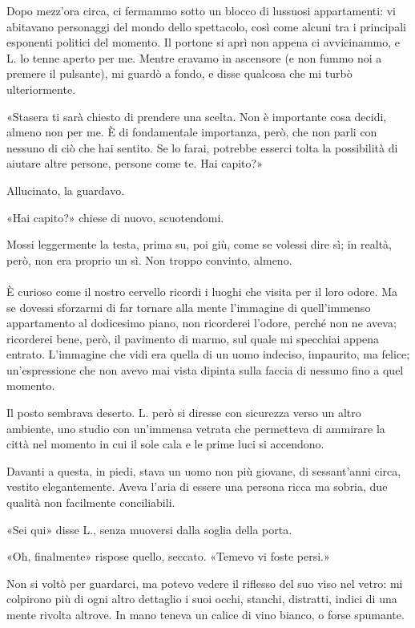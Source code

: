 \documentclass[a4paper,12pt]{book}
\begin{document}
Dopo mezz’ora circa, ci fermammo sotto un blocco di lussuosi appartamenti: vi
abitavano personaggi del mondo dello spettacolo, così come alcuni tra i
principali esponenti politici del momento. Il portone si aprì non appena ci
avvicinammo, e L. lo tenne aperto per me. Mentre eravamo in ascensore (e non
fummo noi a premere il pulsante), mi guardò a fondo, e disse qualcosa che mi
turbò ulteriormente.

«Stasera ti sarà chiesto di prendere una scelta. Non è importante cosa
decidi, almeno non per me. È di fondamentale importanza, però, che non parli
con nessuno di ciò che hai sentito. Se lo farai, potrebbe esserci tolta la
possibilità di aiutare altre persone, persone come te. Hai capito?»

Allucinato, la guardavo.

«Hai capito?» chiese di nuovo, scuotendomi.

Mossi leggermente la testa, prima su, poi giù, come se volessi dire sì; in
realtà, però, non era proprio un sì. Non troppo convinto, almeno.

\paragraph{}
È curioso come il nostro cervello ricordi i luoghi che visita per il loro
odore. Ma se dovessi sforzarmi di far tornare alla mente l’immagine di
quell’immenso appartamento al dodicesimo piano, non ricorderei l’odore,
perché non ne aveva; ricorderei bene, però, il pavimento di marmo, sul quale
mi specchiai appena entrato. L’immagine che vidi era quella di un uomo
indeciso, impaurito, ma felice; un’espressione che non avevo mai vista dipinta
sulla faccia di nessuno fino a quel momento.

Il posto sembrava deserto. L. però si diresse con sicurezza verso un altro
ambiente, uno studio con un’immensa vetrata che permetteva di ammirare la
città nel momento in cui il sole cala e le prime luci si accendono.

Davanti a questa, in piedi, stava un uomo non più giovane, di sessant’anni
circa, vestito elegantemente. Aveva l’aria di essere una persona ricca ma
sobria, due qualità non facilmente conciliabili.

«Sei qui» disse L., senza muoversi dalla soglia della porta.

«Oh, finalmente» rispose quello, seccato. «Temevo vi foste persi.»

Non si voltò per guardarci, ma potevo vedere il riflesso del suo viso nel
vetro: mi colpirono più di ogni altro dettaglio i suoi occhi, stanchi,
distratti, indici di una mente rivolta altrove. In mano teneva un calice di vino
bianco, o forse spumante.
\end{document}
